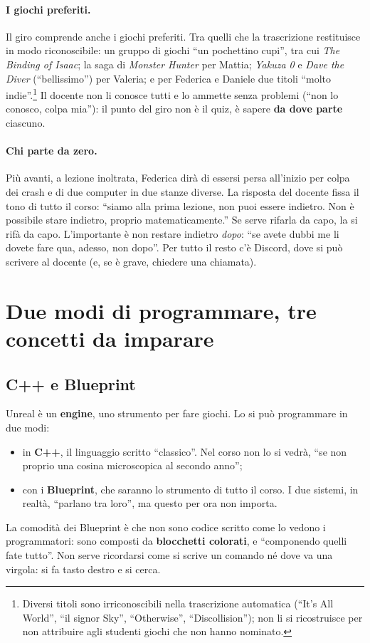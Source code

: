 \paragraph{I giochi preferiti.} Il giro comprende anche i giochi preferiti.
Tra quelli che la trascrizione restituisce in modo riconoscibile: un gruppo di
giochi ``un pochettino cupi'', tra cui \emph{The Binding of Isaac}; la saga di
\emph{Monster Hunter} per Mattia; \emph{Yakuza 0} e \emph{Dave the Diver}
(``bellissimo'') per Valeria; e per Federica e Daniele due titoli ``molto
indie''.\footnote{Diversi titoli sono irriconoscibili nella trascrizione
automatica (``It's All World'', ``il signor Sky'', ``Otherwise'',
``Discollision''); non li si ricostruisce per non attribuire agli studenti
giochi che non hanno nominato.} Il docente non li conosce tutti e lo ammette
senza problemi (``non lo conosco, colpa mia''): il punto del giro non è il
quiz, è sapere \textbf{da dove parte} ciascuno.

\paragraph{Chi parte da zero.} Più avanti, a lezione inoltrata, Federica dirà
di essersi persa all'inizio per colpa dei crash e di due computer in due
stanze diverse. La risposta del docente fissa il tono di tutto il corso:
``siamo alla prima lezione, non puoi essere indietro. Non è possibile stare
indietro, proprio matematicamente.'' Se serve rifarla da capo, la si rifà da
capo. L'importante è non restare indietro \emph{dopo}: ``se avete dubbi me li
dovete fare qua, adesso, non dopo''. Per tutto il resto c'è Discord, dove si
può scrivere al docente (e, se è grave, chiedere una chiamata).

\section{Due modi di programmare, tre concetti da imparare}
\label{gd7:sec:tre-concetti}

\subsection{C++ e Blueprint}

Unreal è un \textbf{engine}, uno strumento per fare giochi. Lo si può
programmare in due modi:
\begin{itemize}
  \item in \textbf{C++}, il linguaggio scritto ``classico''. Nel corso non lo
        si vedrà, ``se non proprio una cosina microscopica al secondo
        anno'';
  \item con i \textbf{Blueprint}, che saranno lo strumento di tutto il
        corso. I due sistemi, in realtà, ``parlano tra loro'', ma questo per
        ora non importa.
\end{itemize}
La comodità dei Blueprint è che non sono codice scritto come lo vedono i
programmatori: sono composti da \textbf{blocchetti colorati}, e ``componendo
quelli fate tutto''. Non serve ricordarsi come si scrive un comando né dove va
una virgola: si fa tasto destro e si cerca.

